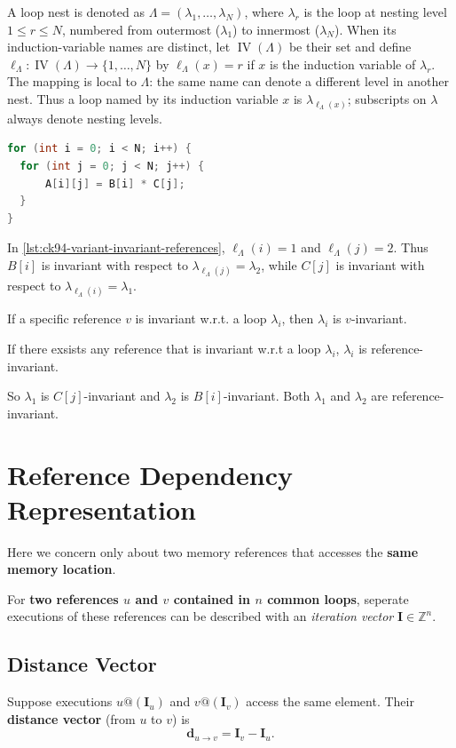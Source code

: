 A loop nest is denoted as $\Lambda=(\lambda_1,\ldots,\lambda_N)$, where
$\lambda_r$ is the loop at nesting level $1 \le r \le N$, numbered
from outermost ($\lambda_1$) to innermost ($\lambda_N$). When its
induction-variable names are distinct, let $\operatorname{IV}(\Lambda)$ be
their set and define
$\ell_{\Lambda}:\operatorname{IV}(\Lambda)\to\{1,\ldots,N\}$ by
$\ell_{\Lambda}(x)=r$ if $x$ is the induction variable of $\lambda_r$.
The mapping is local to $\Lambda$: the same name can denote a different level
in another nest. Thus a loop named by its induction variable $x$ is
$\lambda_{\ell_{\Lambda}(x)}$; subscripts on $\lambda$ always denote nesting levels.

\begin{lstlisting}[label={lst:ck94-variant-invariant-references},
language=C,caption={Loop Variant and Invariant References.}]
for (int i = 0; i < N; i++) {
  for (int j = 0; j < N; j++) {
      A[i][j] = B[i] * C[j];
  }
}
\end{lstlisting}


In \cref{lst:ck94-variant-invariant-references},
$\ell_{\Lambda}(i)=1$ and $\ell_{\Lambda}(j)=2$. Thus $B[i]$ is invariant
with respect to $\lambda_{\ell_{\Lambda}(j)}=\lambda_2$, while $C[j]$ is
invariant with respect to $\lambda_{\ell_{\Lambda}(i)}=\lambda_1$.

If a specific reference $v$ is invariant w.r.t. a loop $\lambda_{i}$, then
$\lambda_{i}$ is $v$-invariant.

If there exsists any reference that is invariant w.r.t a loop $\lambda_{i}$,
$\lambda_{i}$ is reference-invariant.

So $\lambda_1$ is $C[j]$-invariant and $\lambda_2$ is
$B[i]$-invariant. Both $\lambda_1$ and $\lambda_2$ are reference-invariant.

\section{Reference Dependency Representation}
Here we concern only about two memory references that accesses the
\textbf{same memory location}.

For \textbf{two references $u$ and $v$ contained in $n$ common loops}, seperate
executions of these references can be described with an \textit{iteration
vector}
$\mathbf{I} \in \mathbb{Z}^{n}$.

\subsection{Distance Vector}
Suppose executions $u@(\mathbf{I}_{u})$ and $v@(\mathbf{I}_{v})$
access the same element. Their \textbf{distance vector} (from $u$ to $v$) is
\begin{equation}
  \mathbf{d}_{u\to v} = \mathbf{I}_{v} - \mathbf{I}_{u}.
  \label{eq:ck94-distance-vector}
\end{equation}


